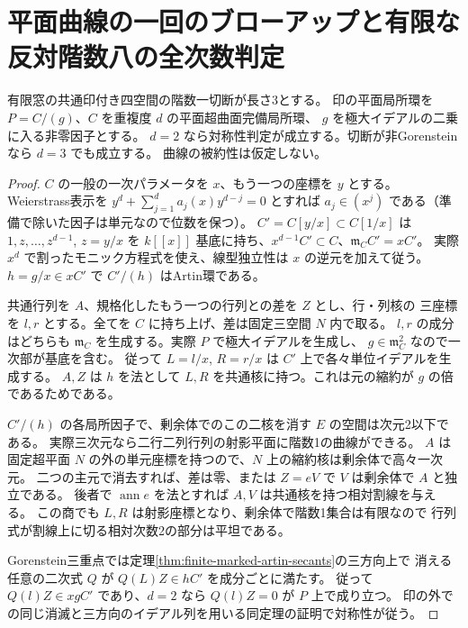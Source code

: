 \section{平面曲線の一回のブローアップと有限な反対階数八の全次数判定}
\label{sec:finite-rank-eight-all-marks}
\begin{lemma}\label{lem:finite-carrier-blowup}
有限窓の共通印付き四空間の階数一切断が長さ3とする。
印の平面局所環を $P=C/(g)$、$C$ を重複度 $d$ の平面超曲面完備局所環、
$g$ を極大イデアルの二乗に入る非零因子とする。
$d=2$ なら対称性判定が成立する。切断が非Gorensteinなら $d=3$ でも成立する。
曲線の被約性は仮定しない。
\end{lemma}
\begin{proof}
$C$ の一般の一次パラメータを $x$、もう一つの座標を $y$ とする。
Weierstrass表示を $y^d+\sum_{j=1}^d a_j(x)y^{d-j}=0$ とすれば
$a_j\in(x^j)$ である（準備で除いた因子は単元なので位数を保つ）。
$C'=C[y/x]\subset C[1/x]$ は $1,z,\ldots,z^{d-1}$, $z=y/x$ を
$k[[x]]$ 基底に持ち、$x^{d-1}C'\subset C$、$\mathfrak m_C C'=x C'$。
実際 $x^d$ で割ったモニック方程式を使え、線型独立性は $x$ の逆元を加えて従う。
$h=g/x\in xC'$ で $C'/(h)$ はArtin環である。

共通行列を $A$、規格化したもう一つの行列との差を $Z$ とし、行・列核の
三座標を $l,r$ とする。全てを $C$ に持ち上げ、差は固定三空間 $N$ 内で取る。
$l,r$ の成分はどちらも $\mathfrak m_C$ を生成する。実際 $P$ で極大イデアルを生成し、
$g\in\mathfrak m_C^2$ なので一次部が基底を含む。
従って $L=l/x$, $R=r/x$ は $C'$ 上で各々単位イデアルを生成する。
$A,Z$ は $h$ を法として $L,R$ を共通核に持つ。これは元の縮約が $g$ の倍であるためである。

$C'/(h)$ の各局所因子で、剰余体でのこの二核を消す $E$ の空間は次元2以下である。
実際三次元なら二行二列行列の射影平面に階数1の曲線ができる。
$A$ は固定超平面 $N$ の外の単元座標を持つので、$N$ 上の縮約核は剰余体で高々一次元。
二つの主元で消去すれば、差は零、または $Z=eV$ で $V$ は剰余体で $A$ と独立である。
後者で $\operatorname{ann}e$ を法とすれば $A,V$ は共通核を持つ相対割線を与える。
この商でも $L,R$ は射影座標となり、剰余体で階数1集合は有限なので
行列式が割線上に切る相対次数2の部分は平坦である。

Gorenstein三重点では定理\ref{thm:finite-marked-artin-secants}の三方向上で
消える任意の二次式 $Q$ が $Q(L)Z\in h C'$ を成分ごとに満たす。
従って $Q(l)Z\in xg C'$ であり、$d=2$ なら $Q(l)Z=0$ が $P$ 上で成り立つ。
印の外での同じ消滅と三方向のイデアル列を用いる同定理の証明で対称性が従う。


\end{proof}
